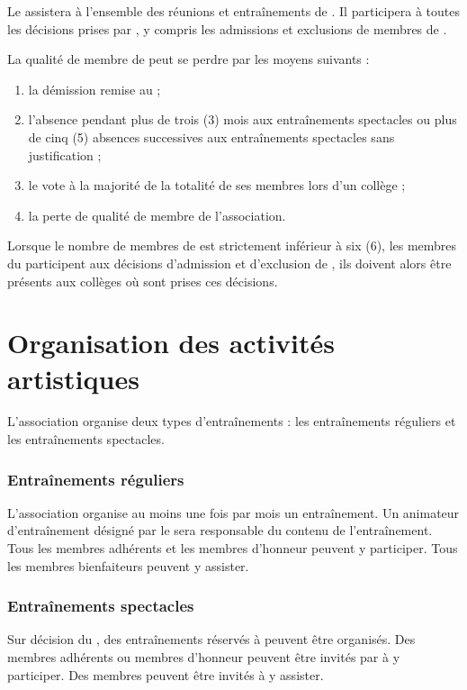 Le \DA{} assistera à l'ensemble des réunions et entraînements de \troupe{}. Il participera à toutes les décisions prises par \troupe{}, y compris les admissions et exclusions de membres de \troupe{}.

La qualité de membre de \troupe{} peut se perdre par les moyens suivants :

\begin{enumerate}
	\item la démission remise au \DA{} ;
	\item l'absence pendant plus de trois  (3) mois aux entraînements spectacles ou plus de cinq (5) absences successives aux entraînements spectacles sans justification ;
	\item le vote à la majorité de la totalité de ses membres lors d'un collège ;
	\item la perte de qualité de membre de l'association.

\end{enumerate}

Lorsque le nombre de membres de \troupe{} est strictement inférieur à six (6), les membres du \bureau{} participent aux décisions d'admission et d'exclusion de \troupe{}, ils doivent alors être présents aux collèges où sont prises ces décisions.

\section{Organisation des activités artistiques}
\label{sec:entrainements}
L'association organise deux types d'entraînements : les entraînements réguliers et les entraînements spectacles.

\subsubsection*{Entraînements réguliers}
L'association organise au moins une fois par mois un entraînement. Un animateur d'entraînement désigné par le \DA{} sera responsable du contenu de l'entraînement. Tous les membres adhérents et les membres d'honneur peuvent y participer. Tous les membres bienfaiteurs peuvent y assister. 

\subsubsection*{Entraînements spectacles}
Sur décision du \DA{}, des entraînements réservés à \troupe{} peuvent être organisés. Des membres adhérents ou membres d'honneur peuvent être invités par \troupe{} à y participer. Des membres peuvent être invités à y assister.

